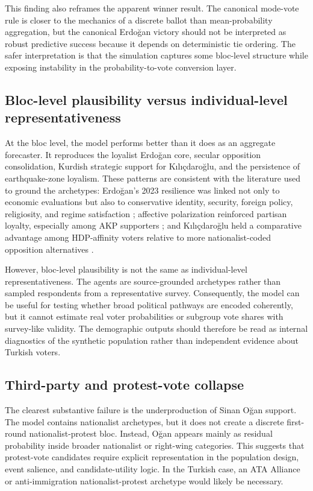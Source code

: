 \documentclass[pdflatex,sn-mathphys-num,iicol]{sn-jnl}
\begin{document}
This finding also reframes the apparent winner result. The canonical mode-vote
rule is closer to the mechanics of a discrete ballot than mean-probability
aggregation, but the canonical Erdoğan victory should not be interpreted as
robust predictive success because it depends on deterministic tie ordering. The
safer interpretation is that the simulation captures some bloc-level structure
while exposing instability in the probability-to-vote conversion layer.

\subsection{Bloc-level plausibility versus individual-level
representativeness}\label{subsec:bloc}

At the bloc level, the model performs better than it does as an aggregate
forecaster. It reproduces the loyalist Erdoğan core, secular opposition
consolidation, Kurdish strategic support for Kılıçdaroğlu, and the persistence
of earthquake-zone loyalism. These patterns are consistent with the literature
used to ground the archetypes: Erdoğan's 2023 resilience was linked not only to
economic evaluations but also to conservative identity, security, foreign policy,
religiosity, and regime satisfaction \cite{carkoglu2024unlikely}; affective
polarization reinforced partisan loyalty, especially among AKP supporters
\cite{aytac2025polarised}; and Kılıçdaroğlu held a comparative advantage among
HDP-affinity voters relative to more nationalist-coded opposition alternatives
\cite{baruh2024difficult}.

However, bloc-level plausibility is not the same as individual-level
representativeness. The agents are source-grounded archetypes rather than
sampled respondents from a representative survey. Consequently, the model can
be useful for testing whether broad political pathways are encoded coherently,
but it cannot estimate real voter probabilities or subgroup vote shares with
survey-like validity. The demographic outputs should therefore be read as
internal diagnostics of the synthetic population rather than independent
evidence about Turkish voters.

\subsection{Third-party and protest-vote collapse}\label{subsec:thirdparty}

The clearest substantive failure is the underproduction of Sinan Oğan support.
The model contains nationalist archetypes, but it does not create a discrete
first-round nationalist-protest bloc. Instead, Oğan appears mainly as residual
probability inside broader nationalist or right-wing categories. This suggests
that protest-vote candidates require explicit representation in the population
design, event salience, and candidate-utility logic. In the Turkish case, an ATA
Alliance or anti-immigration nationalist-protest archetype would likely be
necessary.
\end{document}
